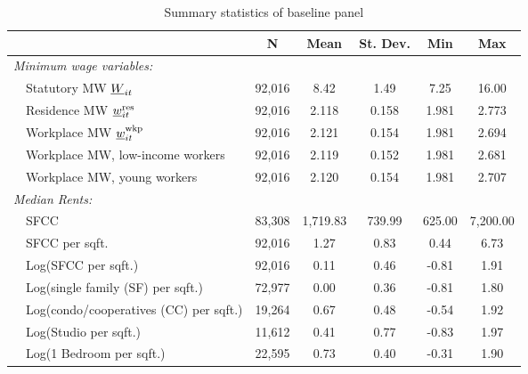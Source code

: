 \begin{table}[hbt!] \centering
    \caption{Summary statistics of baseline panel}
    \label{tab:stats_est_panel}
    \begin{tabular}{@{}lccccc@{}}
        \toprule
                                          & \multicolumn{1}{c}{N} 
                                          & \multicolumn{1}{c}{Mean} 
                                          & \multicolumn{1}{c}{St. Dev.} 
                                          & \multicolumn{1}{c}{Min} 
                                          & \multicolumn{1}{c}{Max}                 \\ \midrule
        \textit{Minimum wage variables:}              &       &       &       &       &       \\
        $\quad$Statutory MW $\underline{W}_{it}$                & 92,016  & 8.42  & 1.49  & 7.25  & 16.00  \\
        $\quad$Residence MW $\underline{w}^{\text{res}}_{it}$         & 92,016  & 2.118  & 0.158  & 1.981  & 2.773  \\
        $\quad$Workplace MW $\underline{w}^{\text{wkp}}_{it}$         & 92,016  & 2.121  & 0.154  & 1.981  & 2.694  \\
        $\quad$Workplace MW, low-income workers       & 92,016  & 2.119  & 0.152  & 1.981  & 2.681  \\
        $\quad$Workplace MW, young workers            & 92,016  & 2.120  & 0.154  & 1.981  & 2.707  \\[.3em]
        \textit{Median Rents:}                        &       &       &       &       &       \\
        $\quad$SFCC                                   & 83,308  & 1,719.83  & 739.99  & 625.00  & 7,200.00  \\
        $\quad$SFCC per sqft.                         & 92,016  & 1.27  & 0.83  & 0.44  & 6.73  \\
        $\quad$Log(SFCC per sqft.)                    & 92,016  & 0.11  & 0.46  & -0.81  & 1.91  \\
        $\quad$Log(single family (SF) per sqft.)      & 72,977  & 0.00  & 0.36  & -0.81  & 1.80  \\
        $\quad$Log(condo/cooperatives (CC) per sqft.) & 19,264  & 0.67  & 0.48  & -0.54  & 1.92  \\
        $\quad$Log(Studio per sqft.)                  & 11,612  & 0.41  & 0.77  & -0.83  & 1.97  \\
        $\quad$Log(1 Bedroom per sqft.)               & 22,595  & 0.73  & 0.40  & -0.31  & 1.90  \\

\end{tabular}
\end{table}
